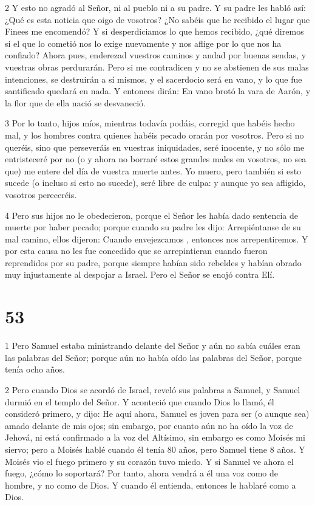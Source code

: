 \par 2 Y esto no agradó al Señor, ni al pueblo ni a su padre. Y su padre les habló así: ¿Qué es esta noticia que oigo de vosotros? ¿No sabéis que he recibido el lugar que Finees me encomendó? Y si desperdiciamos lo que hemos recibido, ¿qué diremos si el que lo cometió nos lo exige nuevamente y nos aflige por lo que nos ha confiado? Ahora pues, enderezad vuestros caminos y andad por buenas sendas, y vuestras obras perdurarán. Pero si me contradicen y no se abstienen de sus malas intenciones, se destruirán a sí mismos, y el sacerdocio será en vano, y lo que fue santificado quedará en nada. Y entonces dirán: En vano brotó la vara de Aarón, y la flor que de ella nació se desvaneció.

\par 3 Por lo tanto, hijos míos, mientras todavía podáis, corregid que habéis hecho mal, y los hombres contra quienes habéis pecado orarán por vosotros. Pero si no queréis, sino que perseveráis en vuestras iniquidades, seré inocente, y no sólo me entristeceré por no (o y ahora no borraré estos grandes males en vosotros, no sea que) me entere del día de vuestra muerte antes. Yo muero, pero también si esto sucede (o incluso si esto no sucede), seré libre de culpa: y aunque yo sea afligido, vosotros pereceréis.

\par 4 Pero sus hijos no le obedecieron, porque el Señor les había dado sentencia de muerte por haber pecado; porque cuando su padre les dijo: Arrepiéntanse de su mal camino, ellos dijeron: Cuando envejezcamos , entonces nos arrepentiremos. Y por esta causa no les fue concedido que se arrepintieran cuando fueron reprendidos por su padre, porque siempre habían sido rebeldes y habían obrado muy injustamente al despojar a Israel. Pero el Señor se enojó contra Elí.

\chapter{53}

\par 1 Pero Samuel estaba ministrando delante del Señor y aún no sabía cuáles eran las palabras del Señor; porque aún no había oído las palabras del Señor, porque tenía ocho años.

\par 2 Pero cuando Dios se acordó de Israel, reveló sus palabras a Samuel, y Samuel durmió en el templo del Señor. Y aconteció que cuando Dios lo llamó, él consideró primero, y dijo: He aquí ahora, Samuel es joven para ser (o aunque sea) amado delante de mis ojos; sin embargo, por cuanto aún no ha oído la voz de Jehová, ni está confirmado a la voz del Altísimo, sin embargo es como Moisés mi siervo; pero a Moisés hablé cuando él tenía 80 años, pero Samuel tiene 8 años. Y Moisés vio el fuego primero y su corazón tuvo miedo. Y si Samuel ve ahora el fuego, ¿cómo lo soportará? Por tanto, ahora vendrá a él una voz como de hombre, y no como de Dios. Y cuando él entienda, entonces le hablaré como a Dios.

